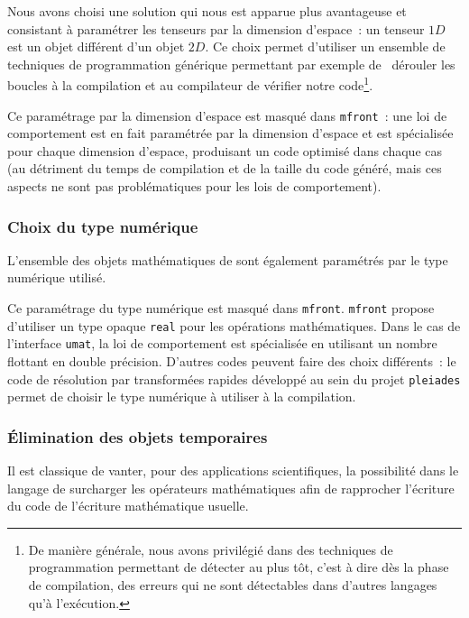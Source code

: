 \documentclass[rectoverso,pleiades,pstricks,leqno,anti]{texmf/note_technique_2010}
\newcommand{\pleiades}{\texttt{pleiades}}
\newcommand{\mfront}{\texttt{mfront}}
\newcommand{\tfel}[1]{\index{tfel}{#1}{\texttt{#1}}}
\def\ifmonospace{\ifdim\fontdimen3\font=0pt }
\def\cpp{%
\ifmonospace%
    C++%
\else%
    C\kern-.1667em\raise.30ex\hbox{\smaller{++}}%
\fi%
\spacefactor1000 }
\begin{document}
Nous avons choisi une solution qui nous est apparue plus avantageuse et
consistant à paramétrer les tenseurs par la dimension d'espace~: un
tenseur \(1D\) est un objet différent d'un objet \(2D\). Ce choix permet
d'utiliser un ensemble de techniques de programmation générique
permettant par exemple de \og~dérouler les boucles\fg{} à la compilation
et au compilateur de vérifier notre code\footnote{De manière générale,
  nous avons privilégié dans \tfel{} des techniques de programmation
  permettant de détecter au plus tôt, c'est à dire dès la phase de
  compilation, des erreurs qui ne sont détectables dans d'autres
  langages qu'à l'exécution.}.

Ce paramétrage par la dimension d'espace est masqué dans \mfront{}~:
une loi de comportement est en fait paramétrée par la dimension
d'espace et est spécialisée pour chaque dimension d'espace, produisant
un code optimisé dans chaque cas (au détriment du temps de compilation
et de la taille du code généré, mais ces aspects ne sont pas
problématiques pour les lois de comportement).

\subsubsection{Choix du type numérique}

L'ensemble des objets mathématiques de \tfel{} sont également
paramétrés par le type numérique utilisé. 

Ce paramétrage du type numérique est masqué dans \mfront{}. \mfront{}
propose d'utiliser un type opaque \texttt{real} pour les opérations
mathématiques. Dans le cas de l'interface \texttt{umat}, la loi de
comportement est spécialisée en utilisant un nombre flottant en double
précision. D'autres codes peuvent faire des choix différents~: le code
de résolution par transformées rapides développé au sein du projet
\pleiades{} permet de choisir le type numérique à utiliser à la
compilation.

\subsubsection{Élimination des objets temporaires}

Il est classique de vanter, pour des applications scientifiques, la
possibilité dans le langage \cpp{} de surcharger les opérateurs
mathématiques afin de rapprocher l'écriture du code de l'écriture
mathématique usuelle.
\end{document}
